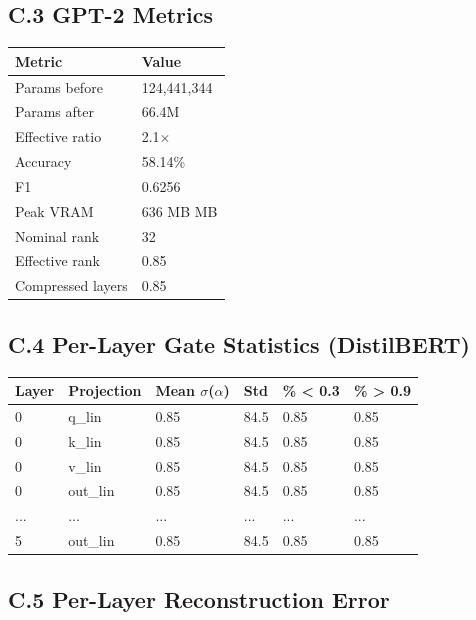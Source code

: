 \subsection{C.3 GPT-2 Metrics}

\begin{table}[H]
\centering
\small
\begin{tabular}{ll}
\toprule
\textbf{Metric} & \textbf{Value} \\
\midrule
Params before & 124,441,344 \\
Params after & 66.4M \\
Effective ratio & 2.1$\times$ \\
Accuracy & 58.14\% \\
F1 & 0.6256 \\
Peak VRAM & 636 MB MB \\
Nominal rank & 32 \\
Effective rank & 0.85 \\
Compressed layers & 0.85 \\
\bottomrule
\end{tabular}
\end{table}

\subsection{C.4 Per-Layer Gate Statistics (DistilBERT)}

\begin{table}[H]
\centering
\small
\begin{tabular}{llllll}
\toprule
\textbf{Layer} & \textbf{Projection} & \textbf{Mean $\sigma$($\alpha$)} & \textbf{Std} & \textbf{\% < 0.3} & \textbf{\% > 0.9} \\
\midrule
0 & q\_lin & 0.85 & 84.5 & 0.85 & 0.85 \\
0 & k\_lin & 0.85 & 84.5 & 0.85 & 0.85 \\
0 & v\_lin & 0.85 & 84.5 & 0.85 & 0.85 \\
0 & out\_lin & 0.85 & 84.5 & 0.85 & 0.85 \\
... & ... & ... & ... & ... & ... \\
5 & out\_lin & 0.85 & 84.5 & 0.85 & 0.85 \\
\bottomrule
\end{tabular}
\end{table}

\subsection{C.5 Per-Layer Reconstruction Error}

